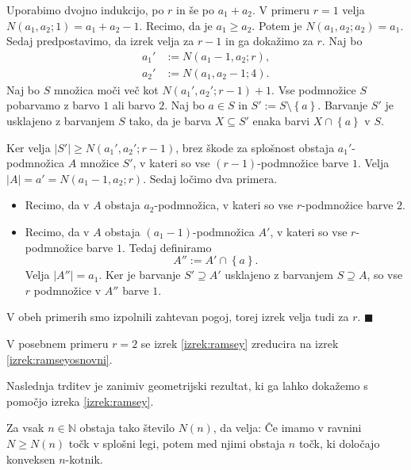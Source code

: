 \documentclass[twoside,11pt]{article}
\providecommand{\set}[1]{\left\{#1\right\}}
\providecommand{\abs}[1]{\left\lvert #1\right\rvert}
\begin{document}
\begin{dokaz}
    Uporabimo dvojno indukcijo, po $r$ in še po $a_1 + a_2$. 
    V primeru $r = 1$ velja $N(a_1, a_2; 1) = a_1 + a_2 -1$. Recimo, da je $a_1 \ge a_2$. Potem je 
    $N(a_1, a_2; a_2) = a_1$. Sedaj predpostavimo, da izrek velja za $r-1$ in ga dokažimo za $r$.
    Naj bo
    \begin{align*}
        a_1' &:= N(a_1 - 1, a_2; r), \\
        a_2' &:= N(a_1, a_2 -1; 4).
    \end{align*}
    Naj bo $S$ množica moči več kot $N(a_1', a_2'; r-1) + 1$. Vse podmnožice $S$ pobarvamo z 
    barvo $1$ ali barvo $2$. Naj bo $a \in S$ in $S' := S \setminus \set{a}$. Barvanje $S'$ je 
    usklajeno z barvanjem $S$ tako, da je barva $X \subseteq S'$ enaka barvi $X \cap \set{a}$ v $S$.

    Ker velja $\abs{S'} \ge N(a_1', a_2';r-1)$, brez škode za splošnost obstaja $a_1'$-podmnožica $A$ 
    množice $S'$, v kateri so vse $(r-1)$-podmnožice barve $1$. Velja $\abs{A} = a' = N(a_1-1,a_2;r)$.
    Sedaj ločimo dva primera.
    \begin{itemize}
        \item Recimo, da v $A$ obstaja $a_2$-podmnožica, v kateri so vse $r$-podmnožice barve $2$.
        \item Recimo, da v $A$ obstaja $(a_1-1)$-podmnožica $A'$, v kateri so vse $r$-podmnožice barve $1$. 
        Tedaj definiramo
        \[
            A'' := A' \cap \set{a}.
        \]
        Velja $\abs{A''} = a_1$. Ker je barvanje $S' \supseteq A'$ usklajeno z barvanjem $S \supseteq A$, 
        so vse $r$ podmnožice v $A''$ barve $1$.
    \end{itemize}
    V obeh primerih smo izpolnili zahtevan pogoj, torej izrek velja tudi za $r$. \hfill $\blacksquare$
\end{dokaz}

V posebnem primeru $r = 2$ se izrek \ref{izrek:ramsey} zreducira 
na izrek \ref{izrek:ramseyosnovni}.

Naslednja trditev je zanimiv geometrijski rezultat, ki ga lahko dokažemo 
s pomočjo izreka \ref{izrek:ramsey}. 

\begin{izrek} \label{izrek:happyend}
    Za vsak $n \in \mathbb{N}$ obstaja tako število $N(n)$, da velja: Če imamo v ravnini $N \ge N(n)$
    točk v splošni legi, potem med njimi obstaja $n$ točk, ki določajo konveksen $n$-kotnik.
\end{izrek}
\end{document}
